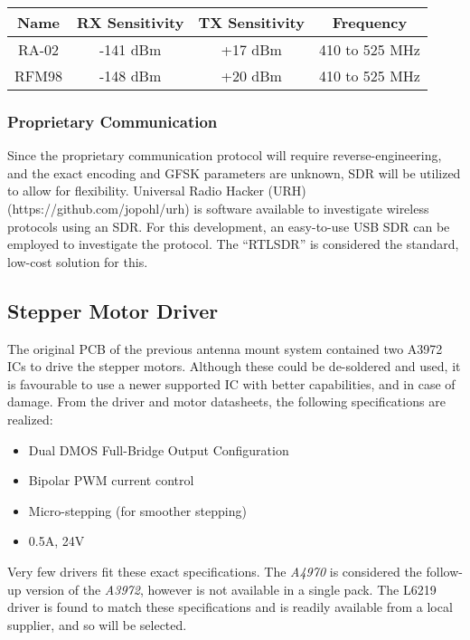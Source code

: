 \begin{table}[!htb]
  \centering
  \renewcommand{\arraystretch}{1.2}
  \begin{tabular}{ |c|c|c|c| }
  \hline
  \textbf{Name}   & \textbf{RX Sensitivity} & \textbf{TX Sensitivity}& \textbf{Frequency} \\
  \hline
  RA-02           & -141 dBm             & +17 dBm              & 410 to 525 MHz     \\
  RFM98           & -148 dBm             & +20 dBm              & 410 to 525 MHz     \\
  \hline
  \end{tabular}
  \caption{}
  \label{tab:rfTransceivers}
\end{table}

\subsubsection{Proprietary Communication}
Since the proprietary communication protocol will require reverse-engineering, and the exact encoding and GFSK parameters are unknown, SDR will be utilized to allow for flexibility. Universal Radio Hacker (URH) (https://github.com/jopohl/urh) is software available to investigate wireless protocols using an SDR. For this development, an easy-to-use USB SDR can be employed to investigate the protocol. The “RTLSDR” is considered the standard, low-cost solution for this.

\subsection{Stepper Motor Driver}
The original PCB of the previous antenna mount system contained two A3972 ICs to drive the stepper motors. Although these could be de-soldered and used, it is favourable to use a newer supported IC with better capabilities, and in case of damage. From the driver and motor datasheets, the following specifications are realized:
\begin{itemize}
    \item Dual DMOS Full-Bridge Output Configuration
    \item Bipolar PWM current control
    \item Micro-stepping (for smoother stepping)
    \item 0.5A, 24V
\end{itemize}

Very few drivers fit these exact specifications. The \textit{A4970} is considered the follow-up version of the \textit{A3972}, however is not available in a single pack. The L6219 driver is found to match these specifications and is readily available from a local supplier, and so will be selected.

